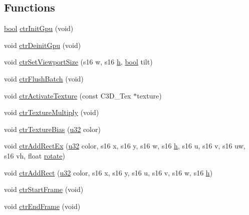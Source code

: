 \subsection*{Functions}
\begin{DoxyCompactItemize}
\item 
\mbox{\hyperlink{libretro_8h_a4a26dcae73fb7e1528214a068aca317e}{bool}} \mbox{\hyperlink{ctr-gpu_8c_a04a94149209a778c397be256b872da4a}{ctr\+Init\+Gpu}} (void)
\item 
void \mbox{\hyperlink{ctr-gpu_8c_a351de94984c7d5ffca8dd11c840f0da1}{ctr\+Deinit\+Gpu}} (void)
\item 
void \mbox{\hyperlink{ctr-gpu_8c_a10edf7402a10780992aef77c359f99b4}{ctr\+Set\+Viewport\+Size}} (s16 w, s16 \mbox{\hyperlink{isa-lr35902_8c_a06a62682361411df32cf88f75a0b8da4}{h}}, \mbox{\hyperlink{libretro_8h_a4a26dcae73fb7e1528214a068aca317e}{bool}} tilt)
\item 
void \mbox{\hyperlink{ctr-gpu_8c_a7ab09886a00743bfac1d2b4aee447a34}{ctr\+Flush\+Batch}} (void)
\item 
void \mbox{\hyperlink{ctr-gpu_8c_aad6f8dfb30a010444bf5c7420904d852}{ctr\+Activate\+Texture}} (const C3\+D\+\_\+\+Tex $\ast$texture)
\item 
void \mbox{\hyperlink{ctr-gpu_8c_aa14fb1c5b08247737637c60db4c01b7c}{ctr\+Texture\+Multiply}} (void)
\item 
void \mbox{\hyperlink{ctr-gpu_8c_ae1021d5113537160c2b2122305ac6980}{ctr\+Texture\+Bias}} (\mbox{\hyperlink{sqlite3_8c_a03ad5adfaeb9b7640dde78a0cc390319}{u32}} color)
\item 
void \mbox{\hyperlink{ctr-gpu_8c_aa59622aca4a180cff8a77bbc0397f4de}{ctr\+Add\+Rect\+Ex}} (\mbox{\hyperlink{sqlite3_8c_a03ad5adfaeb9b7640dde78a0cc390319}{u32}} color, s16 x, s16 y, s16 w, s16 \mbox{\hyperlink{isa-lr35902_8c_a06a62682361411df32cf88f75a0b8da4}{h}}, s16 u, s16 v, s16 uw, s16 vh, float \mbox{\hyperlink{gzappend_8c_a4f13e4c742e47380cfb3aa6744ff89a7}{rotate}})
\item 
void \mbox{\hyperlink{ctr-gpu_8c_a5a8136bc8fce40ba12da3cfaaa617bd4}{ctr\+Add\+Rect}} (\mbox{\hyperlink{sqlite3_8c_a03ad5adfaeb9b7640dde78a0cc390319}{u32}} color, s16 x, s16 y, s16 u, s16 v, s16 w, s16 \mbox{\hyperlink{isa-lr35902_8c_a06a62682361411df32cf88f75a0b8da4}{h}})
\item 
void \mbox{\hyperlink{ctr-gpu_8c_a862d2bcd425f4872ebfd58274e948057}{ctr\+Start\+Frame}} (void)
\item 
void \mbox{\hyperlink{ctr-gpu_8c_afde5ab22c1fe022b58bee18e06dfa89e}{ctr\+End\+Frame}} (void)
\end{DoxyCompactItemize}
